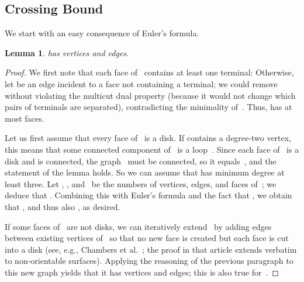 \documentclass[11pt]{article}
\theoremstyle{plain}  \newtheorem{theorem}{Theorem}[section]
\newtheorem{lemma}[theorem]{Lemma}
\theoremstyle{definition}
\begin{document}
\subsection{Crossing Bound}

We start with an easy consequence of Euler's formula.
\begin{lemma}\label{L:sizedual}
   has  vertices and edges.
\end{lemma}
\begin{proof}
  We first note that each face of~ contains at least one terminal:
  Otherwise, let  be an edge incident to a face not containing a
  terminal; we could remove~ without violating the multicut dual
  property (because it would not change which pairs of terminals are
  separated), contradicting the minimality of~.  Thus,  has at
  most  faces.

  Let us first assume that every face of~ is a disk.  If 
  contains a degree-two vertex, this means that some connected component
  of~ is a loop~.  Since each face of~ is a disk and  is
  connected, the graph~ must be connected, so it equals~, and
  the statement of the lemma holds.  So we can assume that  has
  minimum degree at least three.  Let , , and~ be the numbers of
  vertices, edges, and faces of~; we deduce that .  Combining
  this with Euler's formula  and the fact that , we
  obtain that , and thus also , as desired.

  If some faces of~ are not disks, we can iteratively extend~ by
  adding edges between existing vertices of~ so that no new face is
  created but each face is cut into a disk (see, e.g., Chambers et
  al.~\cite[proof of Lemma~2.1]{ccelw-scsh-08}; the proof in that article
  extends verbatim to non-orientable surfaces).  Applying the reasoning of
  the previous paragraph to this new graph yields that it has 
  vertices and edges; this is also true for~.
\end{proof}
\end{document}
